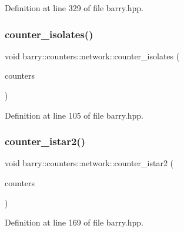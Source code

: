 Definition at line 329 of file barry.\+hpp.

\mbox{\label{namespacebarry_1_1counters_1_1network_a16449353394312feed59aa5444d17dad}} 
\subsubsection{\texorpdfstring{counter\+\_\+isolates()}{counter\_isolates()}}
{\footnotesize\ttfamily void barry\+::counters\+::network\+::counter\+\_\+isolates (\begin{DoxyParamCaption}\item[{\hyperlink{namespacebarry_1_1counters_1_1network_a3b3c590303d47840d1967372ae495d95}{Net\+Counter\+Vector} $\ast$}]{counters }\end{DoxyParamCaption})\hspace{0.3cm}{\ttfamily [inline]}}



Definition at line 105 of file barry.\+hpp.

\mbox{\label{namespacebarry_1_1counters_1_1network_a95eea8464d85c595efa305cdf9a5a82b}} 
\subsubsection{\texorpdfstring{counter\+\_\+istar2()}{counter\_istar2()}}
{\footnotesize\ttfamily void barry\+::counters\+::network\+::counter\+\_\+istar2 (\begin{DoxyParamCaption}\item[{\hyperlink{namespacebarry_1_1counters_1_1network_a3b3c590303d47840d1967372ae495d95}{Net\+Counter\+Vector} $\ast$}]{counters }\end{DoxyParamCaption})\hspace{0.3cm}{\ttfamily [inline]}}



Definition at line 169 of file barry.\+hpp.

